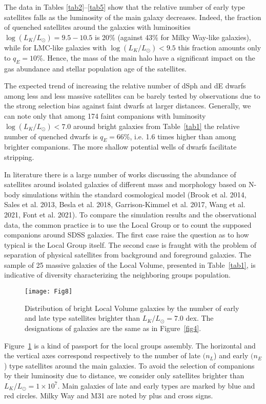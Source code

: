 \documentclass[proof]{WileyASNA-v1}
\begin{document}
The data in Tables \ref{tab2}--\ref{tab5} show that the relative number of early
type satellites falls as the luminosity of the main galaxy decreases. Indeed,
the fraction of quenched satellites around the galaxies with luminosities
$\log(L_K/L_{\odot})= 9.5-10.5$ is 20\% (against 43\% for Milky Way-like
galaxies), while for LMC-like galaxies with $\log(L_K/L_{\odot})<9.5$ this
fraction amounts only to $q_E=10$\%. Hence, the mass of the main halo have a
significant impact on the gas abundance and stellar population age of the
satellites.

The expected trend of increasing the relative number of dSph and dE dwarfs among
less and less massive satellites can be barely tested by observations due to the
strong selection bias against faint dwarfs at larger distances. Generally, we
can note only that among 174 faint companions with luminosity $\log(L_K/
L_{\odot}) < 7.0$ around bright galaxies from Table~\ref{tab1} the relative
number of quenched dwarfs is $q_E=66$\%, i.e. 1.6 times higher than among
brighter companions. The more shallow potential wells of dwarfs facilitate
stripping.

In literature there is a large number of works discussing the abundance of
satellites around isolated galaxies of different mass and morphology based on
N-body simulations within the standard cosmological model (Brook et al. 2014,
Sales et al. 2013, Besla et al. 2018, Garrison-Kimmel et al. 2017, Wang et al.
2021, Font et al. 2021). To compare the simulation results and the observational
data, the common practice is to use the Local Group or to count the supposed
companions around SDSS galaxies. The first case raise the question as to how
typical is the Local Group itself. The second case is fraught with the problem
of separation of physical satellites from background and foreground galaxies.
The sample of 25 massive galaxies of the Local Volume, presented in
Table~\ref{tab1}, is indicative of diversity characterizing the neighboring
groups population.

\begin{figure}[t]
\centerline{\texttt{[image: Fig8]}}
\caption{Distribution of bright Local Volume galaxies by the number of early and
late type satellites brighter than $L_K/L_{\odot}=7.0$ dex. The designations of
galaxies are the same as in Figure~\ref{fig4}.\label{fig8}}
\end{figure}

Figure~\ref{fig8} is a kind of passport for the local groups assembly. The
horizontal and the vertical axes correspond respectively to the number of late
$(n_L$) and early $(n_E$) type satellites around the main galaxies. To avoid the
selection of companions by their luminosity due to distance, we consider only
satellites brighter than $L_K/L_{\odot}=1\times 10^7$. Main galaxies of late and
early types are marked by blue and red circles. Milky Way and M31 are noted by
plus and cross signs.
\end{document}
